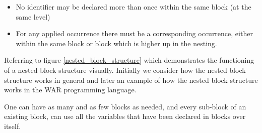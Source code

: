 	\begin{itemize}
	\item No identifier may be declared more than once within the same block (at the same level) %
	\item For any applied occurrence there must be a corresponding occurrence, either within the same block or block which is higher up in the nesting. %
	\end{itemize}
	
	
	Referring to figure \ref{nested_block_structure} which demonstrates the functioning of a nested block structure visually. Initially we consider how the nested block structure works in general and later an example of how the nested block structure works in the WAR programming language.
	
	One can have as many and as few blocks as needed, and every sub-block of an existing block, can use all the variables that have been declared in blocks over itself. 
	
	
		
	 
	
	

\newpage	

	
	
	
